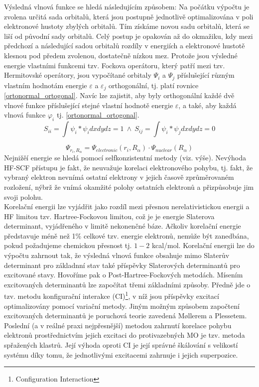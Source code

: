 \documentclass[
  digital, %
  table,   %
  lof,     %
  lot,     %
  oneside,
]{fithesis3}
\begin{document}
Výsledná vlnová funkce se hledá následujícím způsobem: Na počátku výpočtu je zvolena určitá sada orbitalů, která jsou postupně jednotlivě optimalizována v poli elektronové hustoty zbylých orbitalů. Tím získáme novou sadu orbitalů, která se liší od původní sady orbitalů. Celý postup je opakován až do okmažiku, kdy mezi předchozí a následující sadou orbitalů rozdíly v energiích a elektronové hustotě klesnou pod předem zvolenou, dostatečně nízkou mez. Protože jsou výsledné energie vlastními funkcemi tzv. Fockova operátoru, který patří mezi tzv. Hermitovské operátory, jsou vypočítané orbitaly $\Psi_i$ a $\Psi_j$ příslušející různým vlastním hodnotám energie $\varepsilon $ a $\varepsilon_j$ orthogonální, tj. platí rovnice \ref{ortonormal_ortogonal}. Navíc lze zajistit, aby byly orthogonální každé dvě vlnové funkce příslušející stejné vlastní hodnotě energie $\varepsilon $, a také, aby každá vlnová funkce $\varphi_i$ tj. \ref{ortonormal_ortogonal}.
 \begin{equation}
 S_{ii} = \int \psi_i * \psi_i dx dy dz = 1 ~ \wedge ~ S_{ij} = \int \psi_i * \psi_j dx dy dz = 0
 \label{ortonormal_ortogonal}
 \end{equation}

\begin{equation}
  \Psi_{r_i,R_{\alpha}} = \Psi_{electronic}(r_i,R_{\alpha}) \cdot \Psi_{nuclear}(R_{\alpha})
  \label{B_O_approximace}
\end{equation}
Nejnižěí energie se hledá pomocí selfkonzistentní metody (viz. výše).
Nevýhoda HF-SCF přístupu je fakt, že neuvažuje korelaci elektronového pohybu, tj. fakt, že vybraný elektron nevnímá ostatní elektrony v jejich časově zprůměrovaném rozložení, nýbrž že vnímá okamžité polohy ostatních elektronů a přizpůsobuje jim svoji polohu. \\

Korelační energii lze vyjádřit jako rozdíl mezi přesnou nerelativistickou energii a HF limitou tzv. Hartree-Fockovou limitou, což je je energie Slaterova determinant, vyjádřeného v limitě nekonenčné báze. Ačkoliv korelační energie představuje méně než 1\% celkové tzv. energie elektronů, nemůže být zanedbána, pokud požadujeme chemickou přesnost tj. $1-2$ kcal/mol.
Korelační energii lze do výpočtu zahrnout tak, že výsledná vlnová funkce obsahuje mimo Slaterův determinant pro základnní stav také příspěvky Slaterových determinantů pro excitované stavy. Hovoříme pak o Post-Hartree-Fockových metodách. Mísením excitovaných determinantů lze započítat třemi základními způsoby. Předně jde o tzv. metodu konfigurační interakce (CI)\footnote{Configuration Interaction}, v níž jsou příspěvky excitací optimalizovány pomocí variační metody. Jiným možným způsobem započtení excitovaných determinantů je poruchová teorie zavedená M{\o}llerem a Plessetem. Poslední (a v reálné praxi nejpřesnější) metodou zahrnutí korelace pohybu elektronů prostřednictvím jejich excitaci do protivazebných MO je tzv. metoda spřažených klastrů. Její výhoda oproti CI je její správné škálování s velikostí systému díky tomu, že jednotlivými excitacemi zahrnuje i jejich superpozice.
\end{document}
